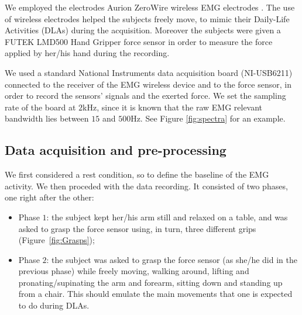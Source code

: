 We employed the electrodes Aurion ZeroWire wireless EMG electrodes
\cite{zerowire}. The use of wireless electrodes helped the subjects
freely move, to mimic their Daily-Life Activities (DLAs) during the
acquisition.
Moreover the subjects were given a FUTEK LMD500 Hand Gripper force
sensor \cite{LMD500} in order to measure the force applied by her/his
hand during the recording.


We used a standard National Instruments data acquisition board
(NI-USB6211) connected to the receiver of the EMG wireless device and
to the force sensor, in order to record the sensors' signals and the
exerted force. We set the sampling rate of the board at $2$kHz, since
it is known that the raw EMG relevant bandwidth lies between $15$ and
$500$Hz. See Figure \ref{fig:spectra} for an example.


\subsection{Data acquisition and pre-processing}

We first considered a rest condition, so to define the baseline of the
EMG activity. We then proceded with the data recording.  It consisted
of two phases, one right after the other:

\begin{itemize}

  \item Phase $1$: the subject kept her/his arm still and relaxed on a
    table, and was asked to grasp the force sensor using, in turn,
    three different grips (Figure~\ref{fig:Grasps});

  \item Phase $2$: the subject was asked to grasp the force sensor (as
    she/he did in the previous phase) while freely moving, walking
    around, lifting and pronating/supinating the arm and forearm,
    sitting down and standing up from a chair. This should emulate the
    main movements that one is expected to do during DLAs.

\end{itemize}

